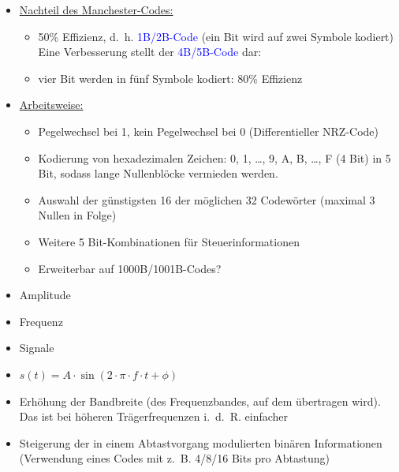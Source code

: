 \begin{itemize}
    \item \underline{Nachteil des Manchester-Codes:}
    \begin{itemize}
        \item 50\% Effizienz, d.\ h. \textcolor{blue}{1B/2B-Code} (ein Bit wird auf zwei Symbole kodiert)
        Eine Verbesserung stellt der \textcolor{blue}{4B/5B-Code} dar:
        \item vier Bit werden in fünf Symbole kodiert: 80\% Effizienz
    \end{itemize}
    \item \underline{Arbeitsweise:}
    \begin{itemize}
        \item Pegelwechsel bei 1, kein Pegelwechsel bei 0 (Differentieller NRZ-Code)
        \item Kodierung von hexadezimalen Zeichen: 0, 1, \ldots, 9, A, B, \ldots, F (4 Bit)
        in 5 Bit, sodass lange Nullenblöcke vermieden werden.
        \item Auswahl der günstigsten 16 der möglichen 32 Codewörter
        (maximal 3 Nullen in Folge)
        \item Weitere 5 Bit-Kombinationen für Steuerinformationen
        \item Erweiterbar auf 1000B/1001B-Codes?
    \end{itemize}
\end{itemize}

\begin{itemize}
    \item Amplitude
    \item Frequenz
    \item Signale
    \item $s(t) = A \cdot \sin(2 \cdot \pi \cdot f \cdot t + \phi)$
\end{itemize}

\begin{itemize}
    \item Erhöhung der Bandbreite (des Frequenzbandes, auf dem übertragen wird).
    Das ist bei höheren Trägerfrequenzen i.\ d.\ R. einfacher
    \item Steigerung der in einem Abtastvorgang modulierten binären Informationen (Verwendung eines Codes mit z.\ B. 4/8/16 Bits pro Abtastung)
\end{itemize}

